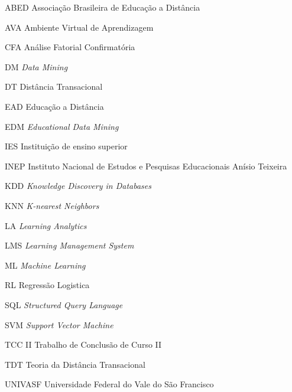 \begin{siglas}
  \item[ABED] Associação Brasileira de Educação a Distância
  \item[AVA] Ambiente Virtual de Aprendizagem
  \item[CFA] Análise Fatorial Confirmatória
  \item[DM] \textit{Data Mining}
  \item[DT] Distância Transacional
  \item[EAD] Educação a Distância
  \item[EDM] \textit{Educational Data Mining}
  \item[IES] Instituição de ensino superior
  \item[INEP] Instituto Nacional de Estudos e Pesquisas Educacionais Anísio Teixeira
  \item[KDD] \textit{Knowledge Discovery in Databases}
  \item[KNN] \textit{K-nearest Neighbors}
  \item[LA] \textit{Learning Analytics}
  \item[LMS] \textit{Learning Management System}
  \item[ML] \textit{Machine Learning}
  \item[RL] Regressão Logistica
  \item[SQL] \textit{Structured Query Language}
  \item[SVM] \textit{Support Vector Machine}
  \item[TCC II] Trabalho de Conclusão de Curso II
  \item[TDT] Teoria da Distância Transacional
  \item[UNIVASF] Universidade Federal do Vale do São Francisco
\end{siglas}

\tableofcontents*
\cleardoublepage
